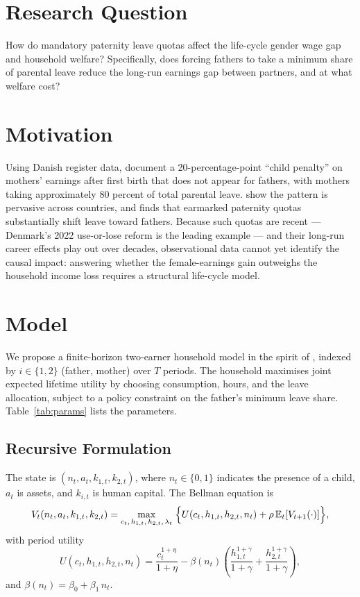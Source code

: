 \section*{Research Question}

How do mandatory paternity leave quotas affect the life-cycle gender wage gap and household welfare? Specifically, does forcing fathers to take a minimum share of parental leave reduce the long-run earnings gap between partners, and at what welfare cost?

\section*{Motivation}

Using Danish register data, \citet{kleven2019children} document a 20-percentage-point ``child penalty'' on mothers' earnings after first birth that does not appear for fathers, with mothers taking approximately 80 percent of total parental leave. \citet{kleven2019childpenalties} show the pattern is pervasive across countries, and \citet{patnaik2019reserving} finds that earmarked paternity quotas substantially shift leave toward fathers. Because such quotas are recent --- Denmark's 2022 use-or-lose reform is the leading example --- and their long-run career effects play out over decades, observational data cannot yet identify the causal impact: answering whether the female-earnings gain outweighs the household income loss requires a structural life-cycle model.

\section*{Model}

We propose a finite-horizon two-earner household model in the spirit of \citet{borella2023marriage}, indexed by $i \in \{1,2\}$ (father, mother) over $T$ periods. The household maximises joint expected lifetime utility by choosing consumption, hours, and the leave allocation, subject to a policy constraint on the father's minimum leave share. Table~\ref{tab:params} lists the parameters.

\subsection*{Recursive Formulation}

The state is $(n_t, a_t, k_{1,t}, k_{2,t})$, where $n_t \in \{0,1\}$ indicates the presence of a child, $a_t$ is assets, and $k_{i,t}$ is human capital. The Bellman equation is
\begin{equation}
    V_t(n_t, a_t, k_{1,t}, k_{2,t}) = \max_{c_t,\, h_{1,t},\, h_{2,t},\, \lambda_t}\;\Bigl\{ U(c_t, h_{1,t}, h_{2,t}, n_t) + \rho\,\mathbb{E}_t\!\left[V_{t+1}(\cdot)\right]\Bigr\},
\end{equation}
with period utility
\begin{equation}
    U(c_t, h_{1,t}, h_{2,t}, n_t) = \frac{c_t^{1+\eta}}{1+\eta} - \beta(n_t)\!\left(\frac{h_{1,t}^{1+\gamma}}{1+\gamma} + \frac{h_{2,t}^{1+\gamma}}{1+\gamma}\right),
\end{equation}
and $\beta(n_t) = \beta_0 + \beta_1\, n_t$.

